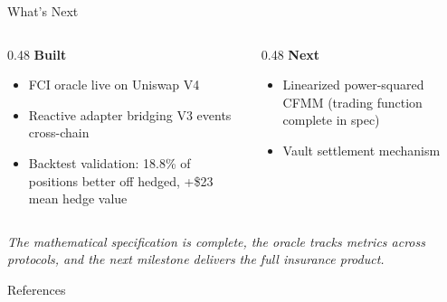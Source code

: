 \documentclass[aspectratio=169]{beamer}
\begin{document}
\begin{frame}{What's Next}

\begin{columns}[T]

\begin{column}{0.48\textwidth}
\textbf{Built}

\begin{itemize}
  \item FCI oracle live on Uniswap V4
  \item Reactive adapter bridging V3 events cross-chain
  \item Backtest validation: 18.8\% of positions better off hedged,
    +\$23 mean hedge value
\end{itemize}
\end{column}

\begin{column}{0.48\textwidth}
\textbf{Next}

\begin{itemize}
  \item Linearized power-squared CFMM (trading function complete in spec)
  \item Vault settlement mechanism
\end{itemize}
\end{column}

\end{columns}

\bigskip

\begin{center}
\textit{The mathematical specification is complete, the oracle tracks metrics
across protocols, and the next milestone delivers the full insurance product.}
\end{center}

\end{frame}

\begin{frame}[allowframebreaks]{References}
\footnotesize

\end{frame}

\end{document}
